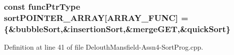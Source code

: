 \hypertarget{_delouth_mansfield-_assn4-_sort_prog_8cpp_ae039780346621e190c7726c08c9a1a13}{
\subsubsection[{sortPOINTER\_\-ARRAY}]{\setlength{\rightskip}{0pt plus 5cm}const {\bf funcPtrType} {\bf sortPOINTER\_\-ARRAY}\mbox{[}{\bf ARRAY\_\-FUNC}\mbox{]} = \{\&bubbleSort,\&insertionSort,\&mergeGET,\&quickSort\}}}
\label{_delouth_mansfield-_assn4-_sort_prog_8cpp_ae039780346621e190c7726c08c9a1a13}


Definition at line 41 of file DelouthMansfield-\/Assn4-\/SortProg.cpp.

